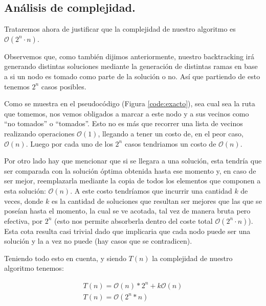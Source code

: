 \vspace*{0.6cm}


\subsection{Análisis de complejidad.}

\vspace*{0.3cm}

Trataremos ahora de justificar que la complejidad de nuestro algoritmo es $\mathcal{O}(2^n \cdot n)$.

Observemos que, como también dijimos anteriormente, nuestro backtracking irá generando distintas soluciones mediante la generación de distintas ramas en base a si un nodo es tomado como parte de la solución o no. Así que partiendo de esto tenemos $2^n$ casos posibles. 

Como se muestra en el pseudocódigo (Figura \ref{code:exacto}), sea cual sea la ruta que tomemos, nos vemos obligados a marcar a este nodo y a sus vecinos como ``no tomados'' o ``tomados''. Esto no es más que recorrer una lista de vecinos realizando operaciones $\mathcal{O}(1)$, llegando a tener un costo de, en el peor caso, $\mathcal{O}(n)$. Luego por cada uno de los $2^n$ casos tendriamos un costo de $\mathcal{O}(n)$.

Por otro lado hay que mencionar que si se llegara a una solución, esta tendría que ser comparada con la solución óptima obtenida hasta ese momento y, en caso de ser mejor, reemplazarla mediante la copia de todos los elementos que componen a esta solución: $\mathcal{O}(n)$. A este costo tendríamos que incurrir una cantidad $k$ de veces, donde $k$ es la cantidad de soluciones que resultan ser mejores que las que se poseían hasta el momento, la cual se ve acotada, tal vez de manera bruta pero efectiva, por $2^n$ (esto nos permite absorberla dentro del coste total $\mathcal{O}(2^n\cdot n)$). Esta cota resulta casi trivial dado que implicaria que cada nodo puede ser una solución y la a vez no puede (hay casos que se contradicen).

Teniendo todo esto en cuenta, y siendo $T(n)$ la complejidad de nuestro algoritmo tenemos:

\begin{equation*}
\begin{array}{l}
T(n) = \mathcal{O}(n)*2^n + k\mathcal{O}(n)\\
T(n) = \mathcal{O}(2^n *n)
\end{array}
\end{equation*}

